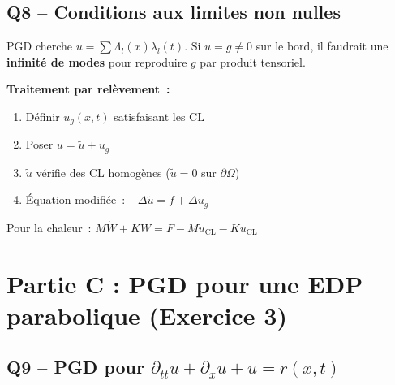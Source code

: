 \documentclass[11pt,a4paper]{article}
\begin{document}
\subsection{Q8 -- Conditions aux limites non nulles}

\begin{formulabox}[Solution]
PGD cherche $u = \sum\Lambda_l(x)\lambda_l(t)$. Si $u=g\neq 0$ sur le bord, il faudrait une \textbf{infinit\'e de modes} pour reproduire $g$ par produit tensoriel.

\textbf{Traitement par rel\`evement~:}
\begin{enumerate}[nosep]
\item D\'efinir $u_g(x,t)$ satisfaisant les CL
\item Poser $u = \tilde{u} + u_g$
\item $\tilde{u}$ v\'erifie des CL homog\`enes ($\tilde{u}=0$ sur $\partial\Omega$)
\item \'Equation modifi\'ee~: $-\Delta\tilde{u} = f + \Delta u_g$
\end{enumerate}
Pour la chaleur~: $M\dot{W} + KW = F - M\dot{u}_\text{CL} - Ku_\text{CL}$
\end{formulabox}

\section{Partie C : PGD pour une EDP parabolique (Exercice 3)}

\subsection{Q9 -- PGD pour $\partial_{tt}u + \partial_x u + u = r(x,t)$}
\end{document}

